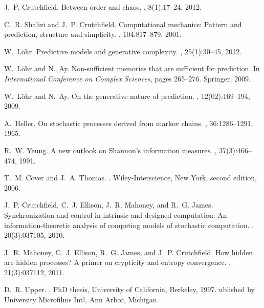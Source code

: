 \documentclass[final,nofootinbib,aps,pre,twocolumn,showpacs,groupaddress,preprintnumbers,floatfix]{revtex4-1}
\begin{document}
\begin{thebibliography}{10}

J.~P. Crutchfield.
\newblock Between order and chaos.
, 8(1):17--24, 2012.

C.~R. Shalizi and J.~P. Crutchfield.
\newblock Computational mechanics: Pattern and prediction, structure and
  simplicity.
, 104:817--879, 2001.

W.~L{\"o}hr.
\newblock Predictive models and generative complexity.
, 25(1):30--45, 2012.

W.~L{\"o}hr and N.~Ay.
\newblock Non-sufficient memories that are sufficient for prediction.
\newblock In {\em International Conference on Complex Sciences}, pages
  265--276. Springer, 2009.

W.~L{\"o}hr and N.~Ay.
\newblock On the generative nature of prediction.
, 12(02):169--194, 2009.

A.~Heller.
\newblock On stochastic processes derived from markov chains.
, 36:1286--1291, 1965.

R.~W. Yeung.
\newblock A new outlook on {Shannon}'s information measures.
, 37(3):466--474, 1991.

T.~M. Cover and J.~A. Thomas.
.
\newblock Wiley-Interscience, New York, second edition, 2006.

J.~P. Crutchfield, C.~J. Ellison, J.~R. Mahoney, and R.~G. James.
\newblock Synchronization and control in intrinsic and designed computation:
  {An} information-theoretic analysis of competing models of stochastic
  computation.
, 20(3):037105, 2010.

J.~R. Mahoney, C.~J. Ellison, R.~G. James, and J.~P. Crutchfield.
\newblock How hidden are hidden processes? {A} primer on crypticity and entropy
  convergence.
, 21(3):037112, 2011.

D.~R. Upper.
.
\newblock PhD thesis, University of California, Berkeley, 1997.
ublished by University Microfilms Intl, Ann Arbor, Michigan.


\end{thebibliography}
\end{document}
